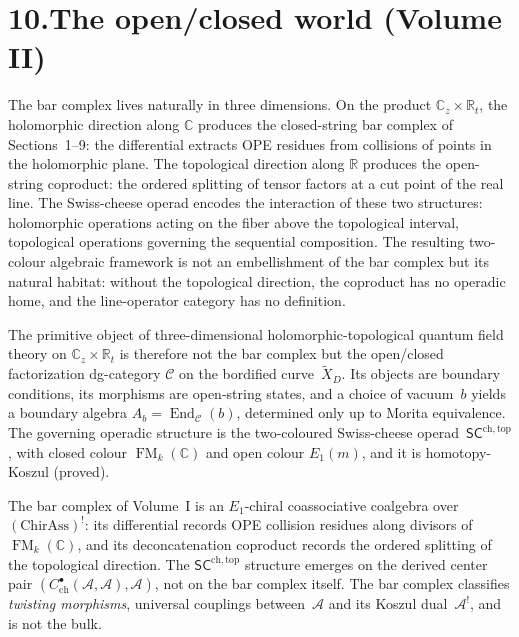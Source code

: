 \documentclass[11pt]{report}
\theoremstyle{definition}
\theoremstyle{remark}
\providecommand{\cA}{\mathcal{A}}
\numberwithin{equation}{section}
\begin{document}
\section*{10.\quad The open/closed world (Volume II)}

The bar complex lives naturally in three dimensions. On the product
$\mathbb C_z \times \mathbb R_t$, the holomorphic direction along
$\mathbb C$ produces the closed-string bar complex of
Sections~1--9: the differential extracts OPE residues from
collisions of points in the holomorphic plane. The topological
direction along $\mathbb R$ produces the open-string coproduct: the
ordered splitting of tensor factors at a cut point of the real line.
The Swiss-cheese operad encodes the interaction of these two
structures: holomorphic operations acting on the fiber above
the topological interval, topological operations governing the
sequential composition. The resulting two-colour algebraic
framework is not an embellishment of the bar complex but its
natural habitat: without the topological direction, the coproduct
has no operadic home, and the line-operator category has no
definition.

The primitive object of three-dimensional holomorphic-topological
quantum field theory on $\mathbb C_z \times \mathbb R_t$ is
therefore not the bar complex but the open/closed factorization
dg-category $\mathcal C$ on the bordified curve~$\widetilde{X}_D$. Its
objects are boundary conditions, its morphisms are open-string
states, and a choice of vacuum~$b$ yields a boundary algebra
$A_b = \operatorname{End}_{\mathcal C}(b)$, determined only up to
Morita equivalence. The governing operadic structure is the two-coloured
Swiss-cheese operad~$\mathsf{SC}^{\mathrm{ch,top}}$, with closed
colour $\operatorname{FM}_k(\mathbb C)$ and open colour $E_1(m)$,
and it is homotopy-Koszul (proved).

The bar complex of Volume~I is an $E_1$-chiral coassociative
coalgebra over $(\mathrm{ChirAss})^!$: its differential records
OPE collision residues along divisors of $\operatorname{FM}_k(\mathbb C)$,
and its deconcatenation coproduct records the ordered splitting of
the topological direction. The $\mathsf{SC}^{\mathrm{ch,top}}$
structure emerges on the derived center pair
$(C^\bullet_{\mathrm{ch}}(\cA,\cA), \cA)$, not on the bar complex
itself. The bar complex classifies \emph{twisting morphisms},
universal couplings between~$\cA$ and its Koszul dual~$\cA^!$,
and is not the bulk.
\end{document}
